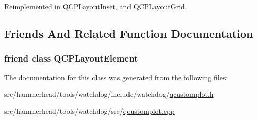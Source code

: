 Reimplemented in \hyperlink{classQCPLayoutInset_a7b33fdd51b18e6db7cea9bfb2d263b4a}{Q\+C\+P\+Layout\+Inset}, and \hyperlink{classQCPLayoutGrid_a07f8dd7d3d61d7345026621d446042a4}{Q\+C\+P\+Layout\+Grid}.



\subsection{Friends And Related Function Documentation}
\subsubsection[{\texorpdfstring{Q\+C\+P\+Layout\+Element}{QCPLayoutElement}}]{\setlength{\rightskip}{0pt plus 5cm}friend class {\bf Q\+C\+P\+Layout\+Element}\hspace{0.3cm}{\ttfamily [friend]}}\hypertarget{classQCPLayout_a0790750c7e7f14fdbd960d172655b42b}{}\label{classQCPLayout_a0790750c7e7f14fdbd960d172655b42b}


The documentation for this class was generated from the following files\+:\begin{DoxyCompactItemize}
\item 
src/hammerhead/tools/watchdog/include/watchdog/\hyperlink{qcustomplot_8h}{qcustomplot.\+h}\item 
src/hammerhead/tools/watchdog/src/\hyperlink{qcustomplot_8cpp}{qcustomplot.\+cpp}\end{DoxyCompactItemize}
